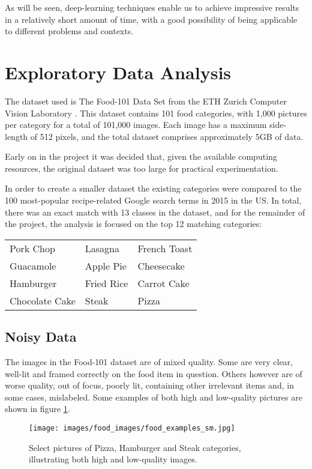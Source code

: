\documentclass[10pt,a4paper]{article}
\begin{document}
As will be seen, deep-learning techniques enable us to achieve impressive results in a relatively short amount of time, with a good possibility of being applicable to different problems and contexts.

\section{Exploratory Data Analysis}

The dataset used is The Food-101 Data Set from the ETH Zurich Computer Vision Laboratory \cite{eth}.
This dataset contains 101 food categories, with 1,000 pictures per category for a total of 101,000 images.
Each image has a maximum side-length of 512 pixels, and the total dataset comprises approximately 5GB of data.

Early on in the project it was decided that, given the available computing resources, the original dataset was too large for practical experimentation.

In order to create a smaller dataset the existing categories were compared to the 100 most-popular recipe-related Google search terms in 2015 in the US. In total, there was an exact match with 13 classes in the dataset, and for the remainder of the project, the analysis is focused on the top 12 matching categories:

\begin{tabular}{p{3.5cm} p{3.5cm} p{3.5cm}}
Pork Chop & Lasagna & French Toast \\
Guacamole & Apple Pie & Cheesecake \\
Hamburger & Fried Rice & Carrot Cake \\
Chocolate Cake & Steak & Pizza \\
\end{tabular}

\subsection*{Noisy Data}

The images in the Food-101 dataset are of mixed quality. Some are very clear, well-lit and framed correctly on the food item in question. Others however are of worse quality, out of focus, poorly lit, containing other irrelevant items and, in some cases, mislabeled. Some examples of both high and low-quality pictures are shown in figure \ref{fig:food_1}.

\begin{figure}[h]
\begin{framed}
\caption{Select pictures of Pizza, Hamburger and Steak categories, illustrating both high and low-quality images.}
  \texttt{[image: images/food\_images/food\_examples\_sm.jpg]}
  \label{fig:food_1}
\end{framed}
\end{figure}
\end{document}

